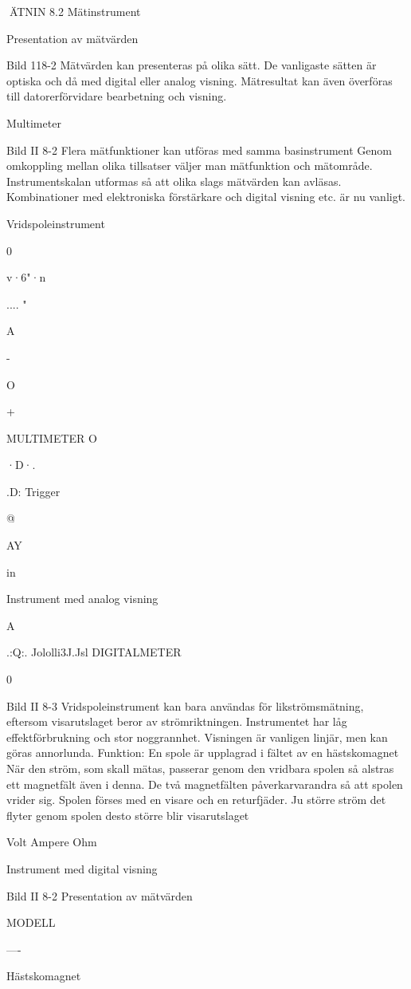 ÄTNIN
8.2 Mätinstrument

Presentation av mätvärden

Bild 118-2
Mätvärden kan presenteras på olika sätt. De
vanligaste sätten är optiska och då med
digital eller analog visning. Mätresultat kan
även överföras till datorerförvidare bearbetning och visning.

Multimeter

Bild II 8-2
Flera mätfunktioner kan utföras med samma
basinstrument Genom omkoppling mellan
olika tillsatser väljer man mätfunktion och
mätområde. Instrumentskalan utformas så
att olika slags mätvärden kan avläsas.
Kombinationer med elektroniska förstärkare
och digital visning etc. är nu vanligt.

Vridspoleinstrument

0

v·6"·n

.... "

A

-

O

+

MULTIMETER O

·D·.

.D:
Trigger

@

AY

in

Instrument med analog visning

A

.:Q:. Jololli3J.Jsl
DIGITALMETER

0

Bild II 8-3
Vridspoleinstrument kan bara användas för
likströmsmätning, eftersom visarutslaget
beror av strömriktningen. Instrumentet har
låg effektförbrukning och stor noggrannhet.
Visningen är vanligen linjär, men kan göras
annorlunda.
Funktion: En spole är upplagrad i fältet av
en hästskomagnet När den ström, som skall
mätas, passerar genom den vridbara spolen
så alstras ett magnetfält även i denna. De två
magnetfälten påverkarvarandra så att spolen
vrider sig. Spolen förses med en visare och
en returfjäder. Ju större ström det flyter genom spolen desto större blir visarutslaget

Volt
Ampere
Ohm

Instrument med digital visning

Bild II 8-2 Presentation av mätvärden

MODELL

----

Hästskomagnet

